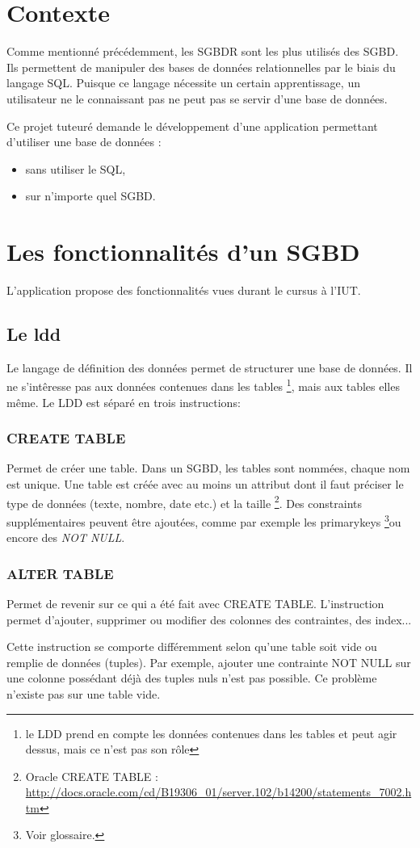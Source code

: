 \section{Contexte}
Comme mentionné précédemment, les SGBDR sont les plus utilisés des SGBD. Ils permettent de manipuler des bases de données relationnelles
par le biais du langage SQL. Puisque ce langage nécessite un certain apprentissage, un utilisateur ne le connaissant pas ne peut pas se servir
d'une base de données.

Ce projet tuteuré demande le développement d'une application permettant d'utiliser une base de données :
\begin{itemize}
\item sans utiliser le SQL,
\item sur n'importe quel SGBD.
\end{itemize}

\section{Les fonctionnalités d'un SGBD}
L'application propose des fonctionnalités vues durant le cursus à l'IUT.

\subsection{Le \gls{ldd}}
Le langage de définition des données permet de structurer une base de données.
Il ne s'intêresse pas aux données contenues dans les tables
\footnote{\label{interet_ldd}le LDD prend en compte les données contenues dans les tables et peut agir dessus, mais ce n'est pas son rôle}, mais aux tables elles même. Le LDD est séparé en trois instructions:

\subsubsection{CREATE TABLE}
Permet de créer une \gls{table}. Dans un SGBD, les tables sont nommées, chaque nom est unique.
Une table est créée avec au moins un attribut dont il faut préciser le type de données (texte, nombre, date etc.) et la taille
\footnote{\label{oracle_create_table_url} Oracle CREATE TABLE : \url{http://docs.oracle.com/cd/B19306_01/server.102/b14200/statements_7002.htm}}.
Des \glspl{constraint} supplémentaires peuvent être ajoutées, comme par exemple les \glspl{primarykey} \footnote{\label{contrainte_clée_primaire}Voir glossaire.}ou encore des \textit{NOT NULL}.

\subsubsection{ALTER TABLE}
Permet de revenir sur ce qui a été fait avec CREATE TABLE.
L'instruction permet d'ajouter, supprimer ou modifier des colonnes des contraintes, des index...

Cette instruction se comporte différemment selon qu'une table soit vide ou remplie de données (\glspl{tuple}).
Par exemple, ajouter une contrainte NOT NULL sur une colonne possédant déjà des tuples nuls n'est pas possible. Ce problème n'existe pas sur une table vide.

